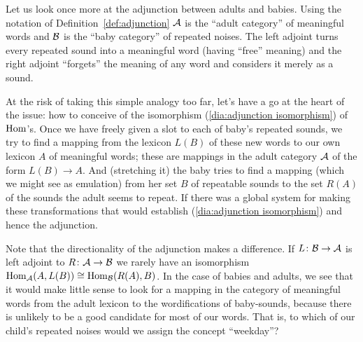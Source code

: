 \documentclass[CT4S-EN-RU]{subfiles}
\begin{document}
\begin{exerciseRUS}\label{ex:monoid adjunction}
\end{exerciseRUS}

\begin{blockENG}
Let us look once more at the adjunction between adults and babies. Using the notation of Definition~\ref{def:adjunction} $\mathcal{A}$ is the “adult category” of meaningful words and $\mathcal{B}$ is the “baby category” of repeated noises. The left adjoint turns every repeated sound into a meaningful word (having “free” meaning) and the right adjoint “forgets” the meaning of any word and considers it merely as a sound. 
\end{blockENG}

\begin{blockRUS}
\end{blockRUS}

\begin{blockENG}
At the risk of taking this simple analogy too far, let's have a go at the heart of the issue: how to conceive of the isomorphism (\ref{dia:adjunction isomorphism}) of $\textnormal{Hom}$'s. Once we have freely given a slot to each of baby's repeated sounds, we try to find a mapping from the lexicon $L(B)$ of these new words to our own lexicon $A$ of meaningful words; these are mappings in the adult category $\mathcal{A}$ of the form $L(B)\to A.$ And (stretching it) the baby tries to find a mapping (which we might see as emulation) from her set $B$ of repeatable sounds to the set $R(A)$ of the sounds the adult seems to repeat. If there was a global system for making these transformations that would establish  (\ref{dia:adjunction isomorphism}) and hence the adjunction.
\end{blockENG}

\begin{blockRUS}
\end{blockRUS}

\begin{blockENG}
Note that the directionality of the adjunction makes a difference. If $L\colon\mathcal{B}\rightarrow\mathcal{A}$ is left adjoint to $R\colon\mathcal{A}\rightarrow\mathcal{B}$ we rarely have an isomorphism $\textnormal{Hom}_\mathcal{A}(A,L(B))\cong\textnormal{Hom}_\mathcal{B}(R(A),B)$. In the case of babies and adults, we see that it would make little sense to look for a mapping in the category of meaningful words from the adult lexicon to the wordifications of baby-sounds, because there is unlikely to be a good candidate for most of our words. That is, to which of our child's repeated noises would we assign the concept “weekday”? 
\end{blockENG}
\end{document}
